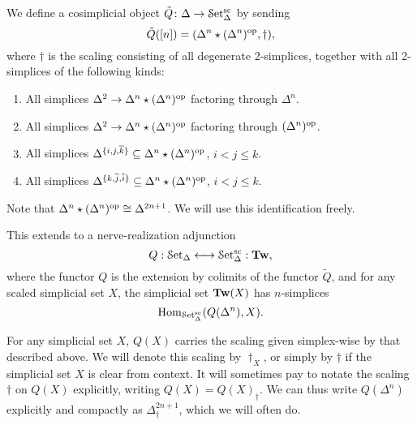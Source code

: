 \documentclass[main.tex]{subfiles}
\begin{document}
\begin{definition}
  We define a cosimplicial object $\tilde{Q}\colon \Delta \to \mathcal{S}\mathrm{et}_{\Delta}^{\mathrm{sc}}$ by sending
  \begin{equation*}
    \tilde{Q}([n]) = (\Delta^{n} \star (\Delta^{n})^{\mathrm{op}}, \dagger),
  \end{equation*}
  where $\dagger$ is the scaling consisting of all degenerate 2-simplices, together with all 2-simplices of the following kinds:
  \begin{enumerate}
    \item All simplices $\Delta^{2} \to \Delta^{n} \star (\Delta^{n})^{\mathrm{op}}$ factoring through $\Delta^{n}$.

    \item All simplices $\Delta^{2} \to \Delta^{n} \star (\Delta^{n})^{\mathrm{op}}$ factoring through $(\Delta^{n})^{\mathrm{op}}$.

    \item All simplices $\Delta^{\{i, j, \overline{k}\}} \subseteq \Delta^{n} \star (\Delta^{n})^{\mathrm{op}}$, $i < j \leq k$.

    \item All simplices $\Delta^{\{k, \overline{j}, \overline{i}\}} \subseteq \Delta^{n} \star (\Delta^{n})^{\mathrm{op}}$, $i < j \leq k$.
  \end{enumerate}
\end{definition}

Note that $\Delta^{n} \star (\Delta^{n})^{\mathrm{op}} \cong \Delta^{2n+1}$. We will use this identification freely.

This extends to a nerve-realization adjunction
\begin{equation*}
  Q : \mathcal{S}\mathrm{et}_{\Delta} \longleftrightarrow \mathcal{S}\mathrm{et}_{\Delta}^{\mathrm{sc}} : \mathbf{Tw},
\end{equation*}
where the functor $Q$ is the extension by colimits of the functor $\tilde{Q}$, and for any scaled simplicial set $X$, the simplicial set $\mathbf{Tw}(X)$ has $n$-simplices
\begin{equation*}
  \mathrm{Hom}_{\mathcal{S}\mathrm{et}_{\Delta}^{\mathrm{sc}}}(Q(\Delta^{n}), X).
\end{equation*}

\begin{notation}
  For any simplicial set $X$, $Q(X)$ carries the scaling given simplex-wise by that described above. We will denote this scaling by $\dagger_{X}$, or simply by $\dagger$ if the simplicial set $X$ is clear from context. It will sometimes pay to notate the scaling $\dagger$ on $Q(X)$ explicitly, writing $Q(X) = Q(X)_{\dagger}$. We can thus write $Q(\Delta^{n})$ explicitly and compactly as $\Delta^{2n+1}_{\dagger}$, which we will often do.
\end{notation}
\end{document}
